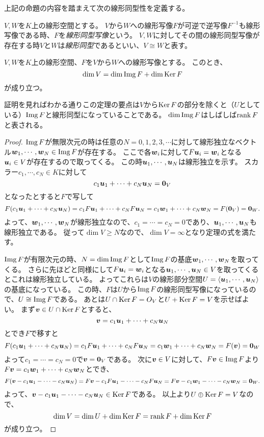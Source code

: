 上記の命題の内容を踏まえて次の線形同型性を定義する。

\begin{definition}[線形同型]
$V, W$を$K$上の線形空間とする。
$V$から$W$への線形写像$F$が可逆で逆写像$F^{-1}$も線形写像である時、$F$を\emph{線形同型写像}という。
$V, W$に対してその間の線形同型写像が存在する時$V$と$W$は\emph{線形同型}であるといい、$V \cong W$と表す。
\end{definition}

\begin{theorem}[次元定理]
$V, W$を$K$上の線形空間、$F$を$V$から$W$への線形写像とする。
このとき、
$$
\dim V = \dim \operatorname{Img} F+\dim \operatorname{Ker} F
$$
が成り立つ。
\end{theorem}

証明を見ればわかる通りこの定理の要点は$V$から$\operatorname{Ker} F$の部分を除くと（$U$としている）$\operatorname{Img} F$と線形同型になっていることである。
$\dim \operatorname{Img} F$はしばしば$\rank F$と表される。

\begin{proof}
$\operatorname{Img} F$が無限次元の時は任意の$N = 0, 1, 2, 3, \cdots$に対して線形独立なベクトル$\vb*{w}_1, \cdots, \vb*{w}_N \in \operatorname{Img} F$が存在する。
ここで各$\vb*{w}_i$に対して$F\vb*{u}_i = \vb*{w}_i$となる$\vb*{u}_i \in V$が存在するので取ってくる。
この時$\vb*{u}_1, \cdots, \vb*{u}_N$は線形独立を示す。
スカラー$c_1, \cdots, c_N \in K$に対して
$$
c_1\vb*{u}_1+\cdots+c_N\vb*{u}_N = \vb*{0}_V
$$
となったとすると$F$で写して
$$
F(c_1\vb*{u}_1+\cdots+c_N\vb*{u}_N)
= c_1 F\vb*{u}_1+\cdots+c_N F\vb*{u}_N
= c_1\vb*{w}_1+\cdots+c_N\vb*{w}_N
= F(\vb*{0}_V)
= \vb*{0}_W.
$$
よって、$\vb*{w}_1, \cdots, \vb*{w}_N$が線形独立なので、$c_1 = \cdots = c_N = 0$であり、$\vb*{u}_1, \cdots, \vb*{u}_N$も線形独立である。
従って$\dim V \ge N$なので、$\dim V = \infty$となり定理の式を満たす。

$\operatorname{Img} F$が有限次元の時、$N = \dim \operatorname{Img} F$として$\operatorname{Img} F$の基底$\vb*{w}_1, \cdots, \vb*{w}_N$を取ってくる。
さらに先ほどと同様にして$F\vb*{u}_i = \vb*{w}_i$となる$\vb*{u}_1, \cdots, \vb*{u}_N \in V$を取ってくるとこれは線形独立している。
よってこれらは$V$の線形部分空間$U = \langle\vb*{u}_1, \cdots, \vb*{u}_N\rangle$の基底になっている。
この時、$F$は$U$から$\operatorname{Img} F$の線形同型写像になっているので、$U \cong \operatorname{Img} F$である。
あとは$U\cap \operatorname{Ker} F = O_V$と$U+\operatorname{Ker} F = V$を示せばよい。
まず$\vb*{v} \in U\cap \operatorname{Ker} F$とすると、
$$
\vb*{v} = c_1\vb*{u}_1+\cdots+c_N\vb*{u}_N
$$
とでき$F$で移すと
$$
F(c_1\vb*{u}_1+\cdots+c_N\vb*{u}_N)
= c_1 F\vb*{u}_1+\cdots+c_N F\vb*{u}_N
= c_1\vb*{w}_1+\cdots+c_N\vb*{w}_N
= F(\vb*{v})
= \vb*{0}_W
$$
よって$c_1 = \cdots = c_N = 0$で$\vb*{v} = \vb*{0}_V$である。
次に$\vb*{v} \in V$に対して、$F\vb*{v} \in \operatorname{Img} F$より$F\vb*{v} = c_1\vb*{w}_1+\cdots+c_N\vb*{w}_N$とでき、
$$
F(\vb*{v}-c_1\vb*{u}_1-\cdots-c_N\vb*{u}_N)
= F\vb*{v}-c_1 F\vb*{u}_1-\cdots-c_N F\vb*{u}_N
= F\vb*{v}-c_1\vb*{w}_1-\cdots-c_N\vb*{w}_N
= \vb*{0}_W.
$$
よって、$\vb*{v}-c_1\vb*{u}_1-\cdots-c_N\vb*{u}_N \in \operatorname{Ker} F$である。
以上より$U\oplus \operatorname{Ker} F = V$なので、
$$
\dim V = \dim U+\dim \operatorname{Ker} F = \rank F+\dim \operatorname{Ker} F
$$
が成り立つ。
\end{proof}

